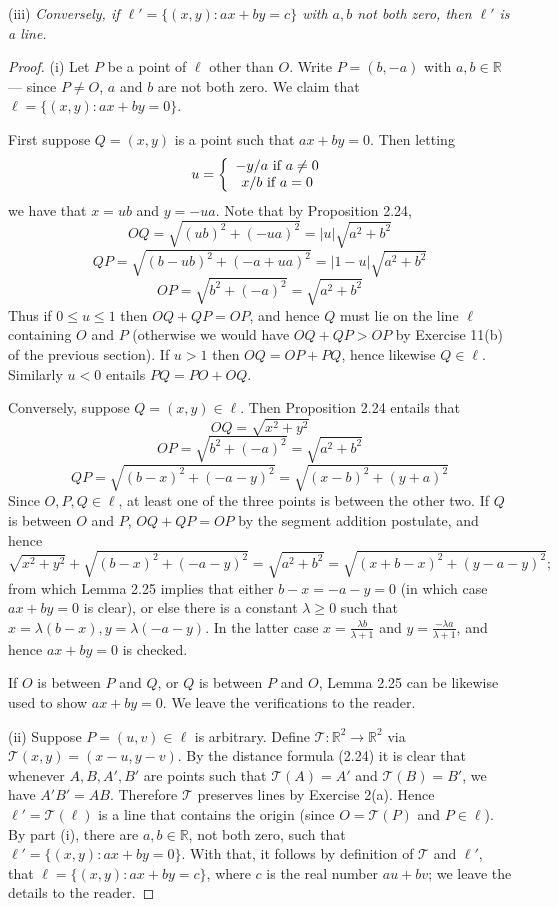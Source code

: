 \documentclass[leqno]{book}
\begin{document}
(iii) \emph{Conversely, if $\ell'=\{(x,y):ax+by=c\}$ with $a,b$ not both zero, then $\ell'$ is a line.}
\begin{proof}
(i) Let $P$ be a point of $\ell$ other than $O$.  Write $P=(b,-a)$ with $a,b\in\mathbb R$ \---- since $P\ne O$, $a$ and $b$ are not both zero.  We claim that $\ell=\{(x,y):ax+by=0\}$.

First suppose $Q=(x,y)$ is a point such that $ax+by=0$.  Then letting
$$u=\left\{\begin{array}{c l}-y/a\text{ if }a\ne 0\\x/b\text{ if }a=0\end{array}\right.$$
we have that $x=ub$ and $y=-ua$.  Note that by Proposition 2.24,
$$OQ=\sqrt{(ub)^2+(-ua)^2}=|u|\sqrt{a^2+b^2}$$
$$QP=\sqrt{(b-ub)^2+(-a+ua)^2}=|1-u|\sqrt{a^2+b^2}$$
$$OP=\sqrt{b^2+(-a)^2}=\sqrt{a^2+b^2}$$
Thus if $0\leqslant u\leqslant 1$ then $OQ+QP=OP$, and hence $Q$ must lie on the line $\ell$ containing $O$ and $P$ (otherwise we would have $OQ+QP>OP$ by Exercise 11(b) of the previous section).  If $u>1$ then $OQ=OP+PQ$, hence likewise $Q\in\ell$.  Similarly $u<0$ entails $PQ=PO+OQ$.

Conversely, suppose $Q=(x,y)\in\ell$.  Then Proposition 2.24 entails that
$$OQ=\sqrt{x^2+y^2}$$
$$OP=\sqrt{b^2+(-a)^2}=\sqrt{a^2+b^2}$$
$$QP=\sqrt{(b-x)^2+(-a-y)^2}=\sqrt{(x-b)^2+(y+a)^2}$$
Since $O,P,Q\in\ell$, at least one of the three points is between the other two.  If $Q$ is between $O$ and $P$, $OQ+QP=OP$ by the segment addition postulate, and hence
$$\sqrt{x^2+y^2}+\sqrt{(b-x)^2+(-a-y)^2}=\sqrt{a^2+b^2}=\sqrt{(x+b-x)^2+(y-a-y)^2};$$
from which Lemma 2.25 implies that either $b-x=-a-y=0$ (in which case $ax+by=0$ is clear), or else there is a constant $\lambda\geqslant 0$ such that $x=\lambda(b-x),y=\lambda(-a-y)$.  In the latter case $x=\frac{\lambda b}{\lambda+1}$ and $y=\frac{-\lambda a}{\lambda+1}$, and hence $ax+by=0$ is checked.

If $O$ is between $P$ and $Q$, or $Q$ is between $P$ and $O$, Lemma 2.25 can be likewise used to show $ax+by=0$.  We leave the verifications to the reader.

(ii) Suppose $P=(u,v)\in\ell$ is arbitrary.  Define $\mathcal T:\mathbb R^2\to\mathbb R^2$ via $\mathcal T(x,y)=(x-u,y-v)$.  By the distance formula (2.24) it is clear that whenever $A,B,A',B'$ are points such that $\mathcal T(A)=A'$ and $\mathcal T(B)=B'$, we have $A'B'=AB$.  Therefore $\mathcal T$ preserves lines by Exercise 2(a).  Hence $\ell'=\mathcal T(\ell)$ is a line that contains the origin (since $O=\mathcal T(P)$ and $P\in\ell$).  By part (i), there are $a,b\in\mathbb R$, not both zero, such that $\ell'=\{(x,y):ax+by=0\}$.  With that, it follows by definition of $\mathcal T$ and $\ell'$, that $\ell=\{(x,y):ax+by=c\}$, where $c$ is the real number $au+bv$; we leave the details to the reader.


\end{proof}
\end{document}
